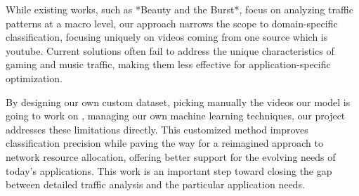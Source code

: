 While existing works, such as *Beauty and the Burst*, focus on analyzing traffic patterns at a macro level, our approach narrows the scope to domain-specific classification, focusing uniquely on videos coming from one source which is youtube. Current solutions often fail to address the unique characteristics of gaming and music traffic, making them less effective for application-specific optimization.

\vspace{2mm}

By designing our own custom dataset, picking manually the videos our model is going to work on  , managing our own machine learning techniques, our project addresses these limitations directly. This customized method improves classification precision while paving the way for a reimagined approach to network resource allocation, offering better support for the evolving needs of today's applications. This work is an important step toward closing the gap between detailed traffic analysis and the particular application needs.